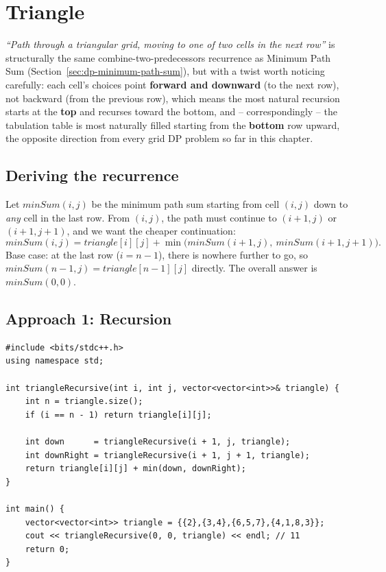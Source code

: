 \section{Triangle}
\label{sec:dp-triangle}


\begin{patternbox}
\emph{``Path through a triangular grid, moving to one of two cells in
the next row''} is structurally the same combine-two-predecessors
recurrence as Minimum Path Sum (Section~\ref{sec:dp-minimum-path-sum}),
but with a twist worth noticing carefully: each cell's choices point
\textbf{forward and downward} (to the next row), not backward
(from the previous row), which means the most natural recursion starts
at the \textbf{top} and recurses toward the bottom, and -- correspondingly
-- the tabulation table is most naturally filled starting from the
\textbf{bottom} row upward, the opposite direction from every grid DP
problem so far in this chapter.
\end{patternbox}

\subsection*{Deriving the recurrence}

Let $\textit{minSum}(i,j)$ be the minimum path sum starting from cell
$(i,j)$ down to \emph{any} cell in the last row. From $(i,j)$, the path
must continue to $(i+1,j)$ or $(i+1,j+1)$, and we want the cheaper
continuation:
\[
  \textit{minSum}(i,j) = \textit{triangle}[i][j] + \min\big(
  \textit{minSum}(i+1,j),\ \textit{minSum}(i+1,j+1)\big).
\]
Base case: at the last row ($i = n-1$), there is nowhere further to go,
so $\textit{minSum}(n-1,j) = \textit{triangle}[n-1][j]$ directly. The
overall answer is $\textit{minSum}(0,0)$.

\subsection*{Approach 1: Recursion}

\begin{lstlisting}
#include <bits/stdc++.h>
using namespace std;

int triangleRecursive(int i, int j, vector<vector<int>>& triangle) {
    int n = triangle.size();
    if (i == n - 1) return triangle[i][j];

    int down      = triangleRecursive(i + 1, j, triangle);
    int downRight = triangleRecursive(i + 1, j + 1, triangle);
    return triangle[i][j] + min(down, downRight);
}

int main() {
    vector<vector<int>> triangle = {{2},{3,4},{6,5,7},{4,1,8,3}};
    cout << triangleRecursive(0, 0, triangle) << endl; // 11
    return 0;
}
\end{lstlisting}

